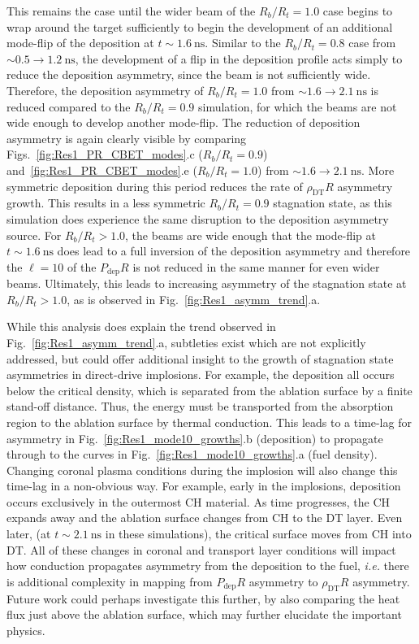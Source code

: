 This remains the case until the wider beam of the $R_b/R_t=1.0$ case begins to wrap around the target sufficiently to begin the development of an additional mode-flip of the deposition at $t\sim1.6\ \text{ns}$.
Similar to the $R_b/R_t=0.8$ case from $\sim0.5\rightarrow1.2\ \text{ns}$, the development of a flip in the deposition profile acts simply to reduce the deposition asymmetry, since the beam is not sufficiently wide.
Therefore, the deposition asymmetry of $R_b/R_t=1.0$ from $\sim1.6\rightarrow2.1\ \text{ns}$ is reduced compared to the $R_b/R_t=0.9$ simulation, for which the beams are not wide enough to develop another mode-flip.
The reduction of deposition asymmetry is again clearly visible by comparing Figs.~\ref{fig:Res1_PR_CBET_modes}.c ($R_b/R_t=0.9$) and~\ref{fig:Res1_PR_CBET_modes}.e ($R_b/R_t=1.0$) from $\sim1.6\rightarrow2.1\ \text{ns}$.
More symmetric deposition during this period reduces the rate of $\rho_{\text{DT}}R$ asymmetry growth.
This results in a less symmetric $R_b/R_t=0.9$ stagnation state, as this simulation does experience the same disruption to the deposition asymmetry source.
For $R_b/R_t>1.0$, the beams are wide enough that the mode-flip at $t\sim1.6\ \text{ns}$ does lead to a full inversion of the deposition asymmetry and therefore the $\ell=10$ of the $P_{\text{dep}}R$ is not reduced in the same manner for even wider beams.
Ultimately, this leads to increasing asymmetry of the stagnation state at $R_b/R_t>1.0$, as is observed in Fig.~\ref{fig:Res1_asymm_trend}.a.

While this analysis does explain the trend observed in Fig.~\ref{fig:Res1_asymm_trend}.a, subtleties exist which are not explicitly addressed, but could offer additional insight to the growth of stagnation state asymmetries in direct-drive implosions.
For example, the deposition all occurs below the critical density, which is separated from the ablation surface by a finite stand-off distance.
Thus, the energy must be transported from the absorption region to the ablation surface by thermal conduction.
This leads to a time-lag for asymmetry in Fig.~\ref{fig:Res1_mode10_growths}.b (deposition) to propagate through to the curves in Fig.~\ref{fig:Res1_mode10_growths}.a (fuel density).
Changing coronal plasma conditions during the implosion will also change this time-lag in a non-obvious way.
For example, early in the implosions, deposition occurs exclusively in the outermost CH material.
As time progresses, the CH expands away and the ablation surface changes from CH to the DT layer.
Even later, (at $t\sim2.1\ \text{ns}$ in these simulations), the critical surface moves from CH into DT.
All of these changes in coronal and transport layer conditions will impact how conduction propagates asymmetry from the deposition to the fuel, \textit{i.e.} there is additional complexity in mapping from $P_{\text{dep}}R$ asymmetry to $\rho_{\text{DT}}R$ asymmetry.
Future work could perhaps investigate this further, by also comparing the heat flux just above the ablation surface, which may further elucidate the important physics.

